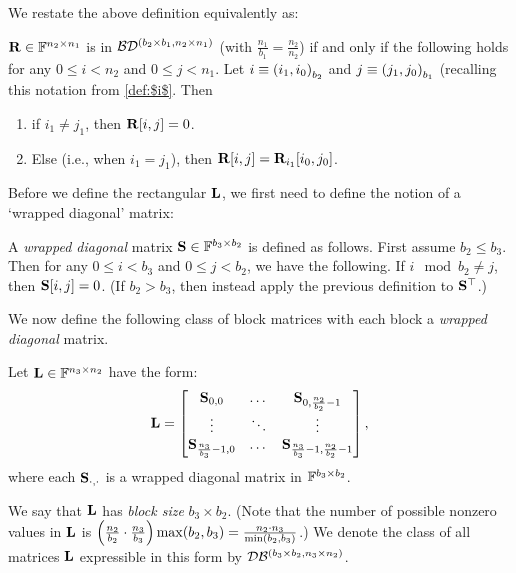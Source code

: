 We restate the above definition equivalently as:
\begin{proposition} \label{prop:rect-R-eqv-def} 
$\mathbf{R}\in\mathbb{F}^{n_2\times n_1}$ is in $\mathcal{B}\mathcal{D}^{(b_2 \times b_1, n_2 \times n_1)}$ (with $\frac {n_1}{b_1}=\frac{n_2}{n_2}$) if and only if the following holds for any
$0\le i < n_2$ and $0\le j< n_1$. Let $i\equiv\left( {{i_1},{i_0}}\right)_{{b_2}}$ and $j\equiv\left( {{j_1},{j_0}}\right)_{{b_1}}$ (recalling this notation from \cref{def:$i$}.  Then
\begin{enumerate}
    \item\label{item:rect-zero-loc-R} if $i_1\ne j_1$, then $\mathbf{R}[i,j]=0$. 
    \item \label{item:rect-nonzero-loc-R} Else (i.e., when $i_1=j_1$), then $\mathbf{R}[i,j]=\mathbf{R}_{i_1}[i_0,j_0]$.
\end{enumerate}

\end{proposition}

Before we define the rectangular $\mathbf{L}$, we first need to define the notion of a `wrapped diagonal' matrix:
\begin{definition} 
\label{def:wrapped-diag}
A {\em wrapped diagonal} matrix $\mathbf{S} \in\mathbb{F}^{b_3\times b_2}$ is defined as follows. First assume $b_2\le b_3$. Then for any $0\le i<b_3$ and $0\le j<b_2$, we have the following. If $i\mod{b_2}\ne j$, then $\mathbf{S}[i,j]=0$. (If $b_2>b_3$, then instead apply the previous definition to $\mathbf{S}^{\top}$.)

\end{definition}


We now define the following class of block matrices with each block a \emph{wrapped diagonal} matrix.
\begin{definition}\label{def:rect-Matrix L}
Let $\mathbf{L}\in\mathbb{F}^{n_3\times n_2}$ have the form: 
    \begin{equation}
        	\label{eq:rect-def-L}
    \mathbf{L}=
    	\begin{bmatrix}
    		\mathbf{S}_{0,0} & \dots & \mathbf{S}_{0,\frac{n_2}{b_2} -1} \\
    		\vdots & \ddots & \vdots \\
    		\mathbf{S}_{\frac{n_3}{b_3} -1,0} & \dots & \mathbf{S}_{\frac{n_3}{b_3} -1,\frac{n_2}{b_2} -1}
    	\end{bmatrix},
    \end{equation}
where each $\mathbf{S}_{\cdot,\cdot}$ is a wrapped diagonal matrix in $\mathbb{F}^{b_3 \times b_2}$.
\end{definition}
We say that $\mathbf{L}$ has {\em block size} $b_3 \times b_2$.
(Note that the number of possible nonzero values in $\mathbf{L}$ is $\left( {\frac {n_2}{b_2}\cdot \frac{n_3}{b_3}}\right) \max(b_2,b_3)=\frac{n_2 \cdot n_3}{\min(b_2,b_3)}$.)
We denote the class of all matrices $\mathbf{L}$ expressible in this form by $\mathcal{D}\mathcal{B}^{(b_3 \times b_2, n_3 \times n_2)}$.

